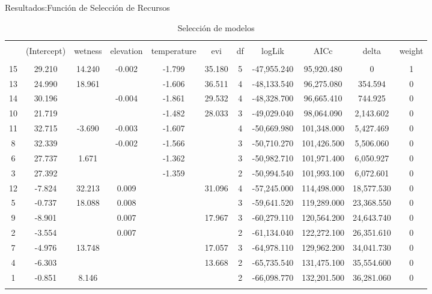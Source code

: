 \documentclass[11pt]{beamer}
\begin{document}
\begin{frame}{Resultados:Función de Selección de Recursos}
{ \tiny
\begin{table}[!htbp] \centering 

\begin{tabular}{@{\hspace{.01\tabcolsep}} ccccccccccc} 
\\[-1.8ex]\hline 
\hline \\[-1.8ex] 
 & (Intercept) & wetness & elevation& temperature& evi& df & logLik & AICc & delta & weight \\ 
\hline \\[-1.8ex] 

15 & 29.210 & 14.240 & -0.002 & -1.799 & 35.180 & 5 & -47,955.240 & 95,920.480 & 0 & 1 \\ 
13 & 24.990 & 18.961 &  & -1.606 & 36.511 & 4 & -48,133.540 & 96,275.080 & 354.594 & 0 \\ 
14 & 30.196 &  & -0.004 & -1.861 & 29.532 & 4 & -48,328.700 & 96,665.410 & 744.925 & 0 \\ 
10 & 21.719 &  &  & -1.482 & 28.033 & 3 & -49,029.040 & 98,064.090 & 2,143.602 & 0 \\ 
11 & 32.715 & -3.690 & -0.003 & -1.607 &  & 4 & -50,669.980 & 101,348.000 & 5,427.469 & 0 \\ 
8 & 32.339 &  & -0.002 & -1.566 &  & 3 & -50,710.270 & 101,426.500 & 5,506.060 & 0 \\ 
6& 27.737 & 1.671 &  & -1.362 &  & 3 & -50,982.710 & 101,971.400 & 6,050.927 & 0 \\ 
3 & 27.392 &  &  & -1.359 &  & 2 & -50,994.540 & 101,993.100 & 6,072.601 & 0 \\ 
12& -7.824 & 32.213 & 0.009 &  & 31.096 & 4 & -57,245.000 & 114,498.000 & 18,577.530 & 0 \\ 
5& -0.737 & 18.088 & 0.008 &  &  & 3 & -59,641.520 & 119,289.000 & 23,368.550 & 0 \\ 
9& -8.901 &  & 0.007 &  & 17.967 & 3 & -60,279.110 & 120,564.200 & 24,643.740 & 0 \\ 
2& -3.554 &  & 0.007 &  &  & 2 & -61,134.040 & 122,272.100 & 26,351.610 & 0 \\ 
7& -4.976 & 13.748 &  &  & 17.057 & 3 & -64,978.110 & 129,962.200 & 34,041.730 & 0 \\ 
4& -6.303 &  &  &  & 13.668 & 2 & -65,735.540 & 131,475.100 & 35,554.600 & 0 \\ 
1& -0.851 & 8.146 &  &  &  & 2 & -66,098.770 & 132,201.500 & 36,281.060 & 0 \\ 
\hline \\[-1.8ex] 
\end{tabular} 
  \caption{Selección de modelos} 

\end{table} 
}
\end{frame}
\end{document}

